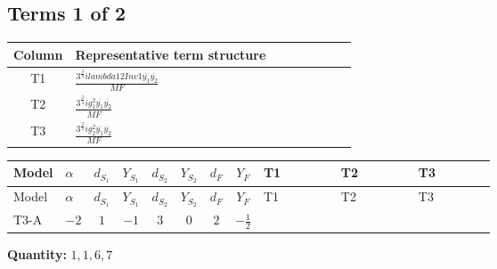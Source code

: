 \documentclass[8pt]{article}
\begin{document}
\begin{landscape}
\subsection*{Terms 1 of 2}
\begin{center}
\begin{tabular}{@{}c >{\raggedright\arraybackslash}p{0.82\linewidth}@{}}
\toprule
Column & Representative term structure \\
\midrule
T1 & \(\displaystyle \frac{3^{\frac{3}{4}} i lambda12Inv1 \overline{y_{1}} \overline{y_{2}}}{MF}\) \\
\midrule
T2 & \(\displaystyle \frac{3^{\frac{3}{4}} i g_{1}^{2} \overline{y_{1}} \overline{y_{2}}}{MF}\) \\
\midrule
T3 & \(\displaystyle \frac{3^{\frac{3}{4}} i g_{2}^{2} \overline{y_{1}} \overline{y_{2}}}{MF}\) \\
\midrule
\bottomrule
\end{tabular}
\end{center}
\smallskip
\tiny
\begin{longtable}{@{}llcccccc >{\raggedright\arraybackslash}p{0.21\linewidth} >{\raggedright\arraybackslash}p{0.21\linewidth} >{\raggedright\arraybackslash}p{0.21\linewidth}@{}}
\toprule
Model & $\alpha$ & $d_{S_1}$ & $Y_{S_1}$ & $d_{S_2}$ & $Y_{S_2}$ & $d_F$ & $Y_F$ & T1 & T2 & T3 \\
\midrule
\endfirsthead
\toprule
Model & $\alpha$ & $d_{S_1}$ & $Y_{S_1}$ & $d_{S_2}$ & $Y_{S_2}$ & $d_F$ & $Y_F$ & T1 & T2 & T3 \\
\midrule
\endhead
T3-A & $-2$ & $1$ & $-1$ & $3$ & $0$ & $2$ & $-\frac{1}{2}$ & \scriptsize\adjustbox{max width=\linewidth}{$\begin{gathered} \frac{3^{\frac{3}{4}} i lambda12Inv1 \overline{y_{1}} \overline{y_{2}}}{6 MF}\end{gathered}$} & \scriptsize\adjustbox{max width=\linewidth}{$\begin{gathered} \frac{3^{\frac{3}{4}} i g_{1}^{2} \overline{y_{1}} \overline{y_{2}}}{8 MF}\end{gathered}$} & \scriptsize\adjustbox{max width=\linewidth}{$\begin{gathered} \frac{11 \cdot 3^{\frac{3}{4}} i g_{2}^{2} \overline{y_{1}} \overline{y_{2}}}{8 MF}\end{gathered}$} \\
\midrule
\bottomrule
\end{longtable}
\clearpage
\noindent\textbf{Quantity: }$\mathrm{1,1,6,7}$\par\smallskip

\end{landscape}
\end{document}
